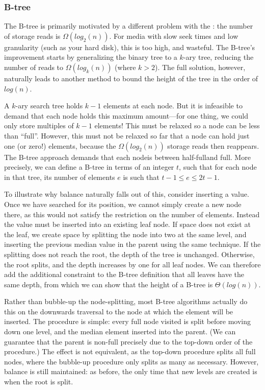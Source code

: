 \subsubsection{B-tree}

The B-tree is primarily motivated by a different problem with the \BST:
  the number of storage reads is $Ω(log_2(n))$.
For media with slow seek times and low granularity
  (such as your hard disk),
  this is too high, and wasteful.
The B-tree's improvement starts by generalizing the binary tree to a $k$-ary tree,
  reducing the number of reads to $Ω(log_k(n))$ (where $k > 2$).
The full solution, however, naturally leads to
  another method to bound the height of the tree in the order of $log(n)$.

A $k$-ary search tree holds $k-1$ elements at each node.
But it is infeasible to demand that each node holds this maximum amount---for
  one thing, we could only store multiples of $k-1$ elements!
This must be relaxed so a node can be less than \enquote{full}.
However, this must not be relaxed so far that
  a node can hold just one (or zero!) elements,
  because the $Ω(log_2(n))$ storage reads then reappears.
The B-tree approach demands that each node\footnotemark is between half-full\footnotemark and full.
More precisely, we can define a B-tree in terms of an integer $t$,
  such that for each node in that tree,
  its number of elements $e$ is such that
  $t-1 ≤ e ≤ 2t-1$.\cite{cormen}


To illustrate why balance naturally falls out of this,
  consider inserting a value.
Once we have searched for its position,
  we cannot simply create a new node there,
  as this would not satisfy the restriction on the number of elements.
Instead the value must be inserted into an existing leaf node.
If space does not exist at the leaf,
  we create space by splitting the node into two at the same level,
  and inserting the previous median value in the parent using the same technique.
If the splitting does not reach the root, the depth of the tree is unchanged.
Otherwise, the root splits, and the depth increases by one for all leaf nodes.
We can therefore add the additional constraint to the B-tree definition
  that all leaves have the same depth,
  from which we can show that
  the height of a B-tree is $Θ(log(n))$.

Rather than bubble-up the node-splitting,
  most B-tree algorithms actually do this on the downwards traversal
  to the node at which the element will be inserted.
The procedure is simple: every full node visited is split before moving down one level,
  and the median element inserted into the parent.
(We can guarantee that the parent is non-full
  precisely due to the top-down order of the procedure.)
The effect is not equivalent,
  as the top-down procedure splits all full nodes,
  where the bubble-up procedure only splits as many as necessary.
However, balance is still maintained:
  as before, the only time that new levels are created is when the root is split.


